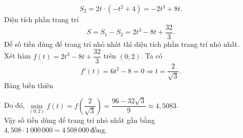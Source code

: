 \begin{ex}
{\begin{itemchoice}
			\[S_2=2t\cdot \left(-t^2+4\right)=-2t^3+8t.\]
			Diện tích phần trang trí
			\[S=S_1-S_2=2t^3-8t+\dfrac{32}{3}.\]
			Để số tiền dùng để trang trí nhỏ nhất thì diện tích phần trang trí nhỏ nhất.\\
			Xét hàm $f(t)=2t^3-8t+\dfrac{32}{3}$ trên $(0;2)$. Ta có
			\[f'(t)=6t^2-8=0\Rightarrow t= \dfrac{2}{\sqrt{3}}.\]
				Bảng biến thiên
				\begin{center}
				\end{center}
			Do đó, $\min\limits_{(0;2)}f(t)=f\left(\dfrac{2}{\sqrt{3}}\right)=\dfrac{96-32\sqrt{3}}{9}\approx 4{,}5083$.\\
				Vậy số tiền dùng để trang trí nhỏ nhất gần bằng	$4{,}508\cdot 1\,000\,000=4\,508\,000\ \text{đồng}.$
		\end{itemchoice}
	}
\end{ex}

